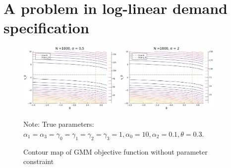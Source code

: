 \documentclass[11pt, a4paper]{article}
\begin{document}

\section{A problem in log-linear demand specification}



\begin{figure}[!htbp]
  \begin{center}
  \includegraphics[width = 0.45\textwidth]
  {figuretable/contour_loglinear_loglinear_n_1000_sigma_0.5.pdf}
  \includegraphics[width = 0.45\textwidth]
  {figuretable/contour_loglinear_loglinear_n_1000_sigma_2.pdf}
  \caption{Contour map of GMM objective function without parameter constraint}
  \label{fg:contour_loglinear_loglinear_n_1000_sigma_2} 
  \end{center}
  \footnotesize
  Note: True parameters: $\alpha_1 = \alpha_3 = \gamma_0 = \gamma_1 = \gamma_2  = \gamma_3 = 1, \alpha_0 = 10, \alpha_2 = 0.1,  \theta = 0.3.$
\end{figure} 
\end{document}
